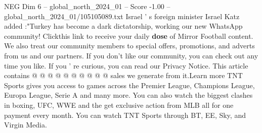 \begin{textsample}{NEG Dim 6 – global\_north\_2024\_01 – Score -1.00 – global\_north\_2024\_01/105105089.txt}
Israel ' s foreign minister Israel Katz added :"Turkey has become a dark dictatorship, working our new WhatsApp community!
Clickthis link to receive your daily \textbf{dose} of Mirror Football content.
We also treat our community members to special offers, promotions, and adverts from us and our partners.
If you don't like our community, you can check out any time you like.
If you ' re curious, you can read our Privacy Notice.
This article contains @ @ @ @ @ @ @ @ @ @ sales we generate from it.Learn more TNT Sports gives you access to games across the Premier League, Champions League, Europa League, Serie A and many more.
You can also watch the biggest clashes in boxing, UFC, WWE and the get exclusive action from MLB all for one payment every month.
You can watch TNT Sports through BT, EE, Sky, and Virgin Media.

\end{textsample}
